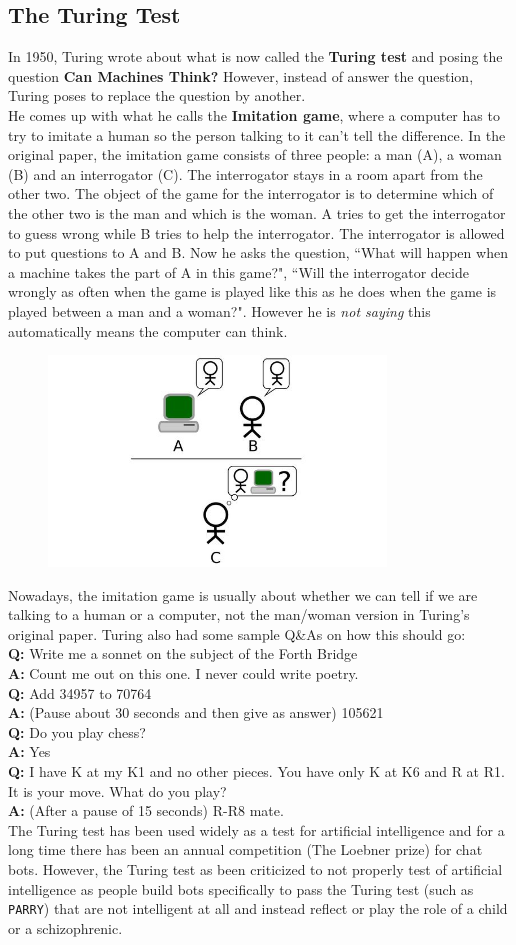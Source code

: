 \documentclass{article}
\newcommand{\n}[0]{\\[\baselineskip]}
\newcommand{\qa}[2]{\textbf{Q:} #1 \\ \textbf{A:} #2}
\begin{document}
\subsection{The Turing Test}
In 1950, Turing wrote about what is now called the \textbf{Turing test} and posing the question \textbf{Can Machines Think?} However, instead of answer the question, Turing poses to replace the question by another.
\n
He comes up with what he calls the \textbf{Imitation game}, where a computer has to try to imitate a human so the person talking to it can't tell the difference. In the original paper, the imitation game consists of three people: a man (A), a woman (B) and an interrogator (C). The interrogator stays in a room apart from the other two. The object of the game for the interrogator is to determine which of the other two is the man and which is the woman. A tries to get the interrogator to guess wrong while B tries to help the interrogator. The interrogator is allowed to put questions to A and B. Now he asks the question, ``What will happen when a machine takes the part of A in this game?", ``Will the interrogator decide wrongly as often when the game is played like this as he does when the game is played between a man and a woman?". However he is \textit{not saying} this automatically means the computer can think.
\begin{figure}[H]
\centering
\includegraphics[width=0.8\textwidth, keepaspectratio]{imgs/turingtest.jpg}
\end{figure}
\noindent
Nowadays, the imitation game is usually about whether we can tell if we are talking to a human or a computer, not the man/woman version in Turing's original paper. Turing also had some sample Q\&As on how this should go:
\n
\qa{Write me a sonnet on the subject of the Forth Bridge}{Count me out on this one. I never could write poetry.}
\n
\qa{Add 34957 to 70764}{(Pause about 30 seconds and then give as answer) 105621}
\n
\qa{Do you play chess?}{Yes}
\\
\qa{I have K at my K1 and no other pieces. You have only K at K6 and R at R1. It is your move. What do you play?}{(After a pause of 15 seconds) R-R8 mate.}
\n
The Turing test has been used widely as a test for artificial intelligence and for a long time there has been an annual competition (The Loebner prize) for chat bots. However, the Turing test as been criticized to not properly test of artificial intelligence as people build bots specifically to pass the Turing test (such as \texttt{PARRY}) that are not intelligent at all and instead reflect or play the role of a child or a schizophrenic. 
\end{document}
